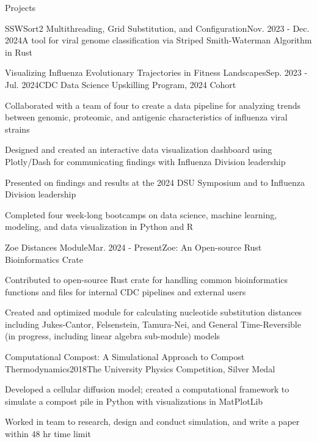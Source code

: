 \documentclass{resume} %
\begin{document}
\begin{rSection}{Projects}
\begin{rSubsection}{SSWSort2 Multithreading, Grid Substitution, and Configuration}{Nov. 2023 - Dec. 2024}{A tool for viral genome classification via Striped Smith-Waterman Algorithm in Rust}{}
  \end{rSubsection}

  \begin{rSubsection}{Visualizing Influenza Evolutionary Trajectories in Fitness Landscapes}{Sep. 2023 - Jul. 2024}{CDC Data Science Upskilling Program, 2024 Cohort}{}
  \item Collaborated with a team of four to create a data pipeline for analyzing trends between genomic, proteomic, and antigenic characteristics of influenza viral strains
  \item Designed and created an interactive data visualization dashboard using Plotly/Dash for communicating findings with Influenza Division leadership
  \item Presented on findings and results at the 2024 DSU Symposium and to Influenza Division leadership
  \item Completed four week-long bootcamps on data science, machine learning, modeling, and data visualization in Python and R
  \end{rSubsection}

  \begin{rSubsection}{Zoe Distances Module}{Mar. 2024 - Present}{Zoe: An Open-source Rust Bioinformatics Crate}{}
  \item Contributed to open-source Rust crate for handling common bioinformatics functions and files for internal CDC pipelines and external users
  \item Created and optimized module for calculating nucleotide substitution distances including Jukes-Cantor, Felsenstein, Tamura-Nei, and General Time-Reversible (in progress, including linear algebra sub-module) models
  \end{rSubsection}

  \begin{rSubsection}{Computational Compost: A Simulational Approach to Compost Thermodynamics}{2018}{The University Physics Competition, Silver Medal}{}
  \item Developed a cellular diffusion model; created a computational framework to simulate a compost pile in Python with visualizations in MatPlotLib
  \item Worked in team to research, design and conduct simulation, and write a paper within 48 hr time limit
  \end{rSubsection}


\end{rSection}
\end{document}
